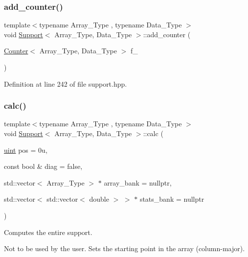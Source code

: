 \subsubsection{\texorpdfstring{add\+\_\+counter()}{add\_counter()}\hspace{0.1cm}{\footnotesize\ttfamily [2/2]}}
{\footnotesize\ttfamily template$<$typename Array\+\_\+\+Type , typename Data\+\_\+\+Type $>$ \\
void \hyperlink{class_support}{Support}$<$ Array\+\_\+\+Type, Data\+\_\+\+Type $>$\+::add\+\_\+counter (\begin{DoxyParamCaption}\item[{\hyperlink{class_counter}{Counter}$<$ Array\+\_\+\+Type, Data\+\_\+\+Type $>$}]{f\+\_\+ }\end{DoxyParamCaption})\hspace{0.3cm}{\ttfamily [inline]}}



Definition at line 242 of file support.\+hpp.

\mbox{\label{class_support_ab5261952be0746f188ee024e3e8c26c1}} 
\subsubsection{\texorpdfstring{calc()}{calc()}}
{\footnotesize\ttfamily template$<$typename Array\+\_\+\+Type , typename Data\+\_\+\+Type $>$ \\
void \hyperlink{class_support}{Support}$<$ Array\+\_\+\+Type, Data\+\_\+\+Type $>$\+::calc (\begin{DoxyParamCaption}\item[{\hyperlink{typedefs_8hpp_a91ad9478d81a7aaf2593e8d9c3d06a14}{uint}}]{pos = {\ttfamily 0u},  }\item[{const bool \&}]{diag = {\ttfamily false},  }\item[{std\+::vector$<$ Array\+\_\+\+Type $>$ $\ast$}]{array\+\_\+bank = {\ttfamily nullptr},  }\item[{std\+::vector$<$ std\+::vector$<$ double $>$ $>$ $\ast$}]{stats\+\_\+bank = {\ttfamily nullptr} }\end{DoxyParamCaption})\hspace{0.3cm}{\ttfamily [inline]}}



Computes the entire support. 

Not to be used by the user. Sets the starting point in the array (column-\/major).


